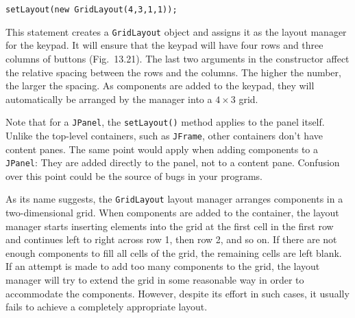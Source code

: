 \begin{jjjlisting}
\begin{lstlisting}
setLayout(new GridLayout(4,3,1,1));
\end{lstlisting}
\end{jjjlisting}

\noindent This statement creates a {\tt GridLayout} object and
assigns it as the layout manager for the keypad. It will ensure that
the keypad will have four rows and three columns of buttons
(Fig.~13.21). The last two arguments in the
constructor affect the relative spacing between the rows and the
columns.  The higher the number, the larger the spacing.  As
components are added to the keypad, they will automatically be
arranged by the manager into a $4 \times 3$ grid.

Note that for a {\tt JPanel}, the {\tt setLayout()} method applies to
the panel itself.  Unlike the top-level containers, such as
{\tt JFrame}, other containers don't have content panes.  The same point
would apply when adding components to a {\tt JPanel}: They are
added directly to the panel, not to a content pane.  Confusion
over this point could be the source of bugs in your programs.


\noindent As its name suggests, the {\tt GridLayout} layout manager arranges
components in a two-dimensional grid.  When components are added to the
container, the layout manager starts inserting elements into the grid
at the first cell in the first row and continues left to right across
row 1, then row 2, and so on.  If there are not enough components to
fill all cells of the grid, the remaining cells are left blank.   If an
attempt is made to add too many components to the grid, the layout
manager will try to extend the grid in some reasonable way in order to
accommodate the components.  However, despite its effort in such cases,
it usually fails to achieve a completely appropriate layout.


